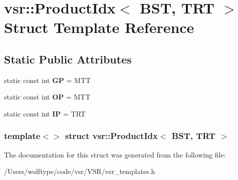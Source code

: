 \hypertarget{structvsr_1_1_product_idx_3_01_b_s_t_00_01_t_r_t_01_4}{\section{vsr\-:\-:Product\-Idx$<$ B\-S\-T, T\-R\-T $>$ Struct Template Reference}
\label{structvsr_1_1_product_idx_3_01_b_s_t_00_01_t_r_t_01_4}
}
\subsection*{Static Public Attributes}
\begin{DoxyCompactItemize}
\item 
\hypertarget{structvsr_1_1_product_idx_3_01_b_s_t_00_01_t_r_t_01_4_aa054abcabdd36c5bb87b1f2491c3b432}{static const int {\bfseries G\-P} = M\-T\-T}\label{structvsr_1_1_product_idx_3_01_b_s_t_00_01_t_r_t_01_4_aa054abcabdd36c5bb87b1f2491c3b432}

\item 
\hypertarget{structvsr_1_1_product_idx_3_01_b_s_t_00_01_t_r_t_01_4_ae9f09e693375dc67940afe109ee07fd4}{static const int {\bfseries O\-P} = M\-T\-T}\label{structvsr_1_1_product_idx_3_01_b_s_t_00_01_t_r_t_01_4_ae9f09e693375dc67940afe109ee07fd4}

\item 
\hypertarget{structvsr_1_1_product_idx_3_01_b_s_t_00_01_t_r_t_01_4_ae02d726d7da489c227765c4eacda7de3}{static const int {\bfseries I\-P} = T\-R\-T}\label{structvsr_1_1_product_idx_3_01_b_s_t_00_01_t_r_t_01_4_ae02d726d7da489c227765c4eacda7de3}

\end{DoxyCompactItemize}
\subsubsection*{template$<$$>$ struct vsr\-::\-Product\-Idx$<$ B\-S\-T, T\-R\-T $>$}



The documentation for this struct was generated from the following file\-:\begin{DoxyCompactItemize}
\item 
/\-Users/wolftype/code/vsr/\-V\-S\-R/vsr\-\_\-templates.\-h\end{DoxyCompactItemize}
